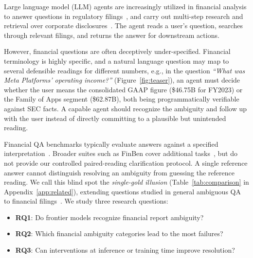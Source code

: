 Large language model (LLM) agents are increasingly utilized in financial analysis to answer questions in regulatory filings~\citep{islam2023financebench,chen2021finqa,reddy2024docfinqa}, and carry out multi-step research and retrieval over corporate disclosures~\citep{bigeard2025financeagent,choi2025finagentbench,krumdick2024bizbench,xie2024finben}. The agent reads a user's question, searches through relevant filings, and returns the answer for downstream actions.

However, financial questions are often deceptively under-specified. Financial terminology is highly specific, and a natural language question may map to several defensible readings for different numbers, e.g., in the question \emph{``What was Meta Platforms' operating income?''} (Figure~\ref{fig:teaser}), an agent must decide whether the user means the consolidated GAAP figure (\$46.75B for FY2023) or the Family of Apps segment (\$62.87B), both being programmatically verifiable against SEC facts. A capable agent should recognize the ambiguity and follow up with the user instead of directly committing to a plausible but unintended reading.

Financial QA benchmarks typically evaluate answers against a specified interpretation~\citep{islam2023financebench,chen2021finqa,reddy2024docfinqa,krumdick2024bizbench}. Broader suites such as FinBen cover additional tasks~\citep{xie2024finben}, but do not provide our controlled paired-reading clarification protocol. A single reference answer cannot distinguish resolving an ambiguity from guessing the reference reading. We call this blind spot the \emph{single-gold illusion} (Table~\ref{tab:comparison} in Appendix~\ref{app:related}), extending questions studied in general ambiguous QA to financial filings~\citep{min2020ambigqa,li2025condambigqa,kuhn2022clam}. We study three research questions: \begin{itemize}[leftmargin=*, topsep=3pt, itemsep=1pt, parsep=0pt]
    \item \textbf{RQ1}: Do frontier models recognize financial report ambiguity?
    \item \textbf{RQ2}: Which financial ambiguity categories lead to the most failures?
    \item \textbf{RQ3}: Can interventions at inference or training time improve resolution?
\end{itemize}

